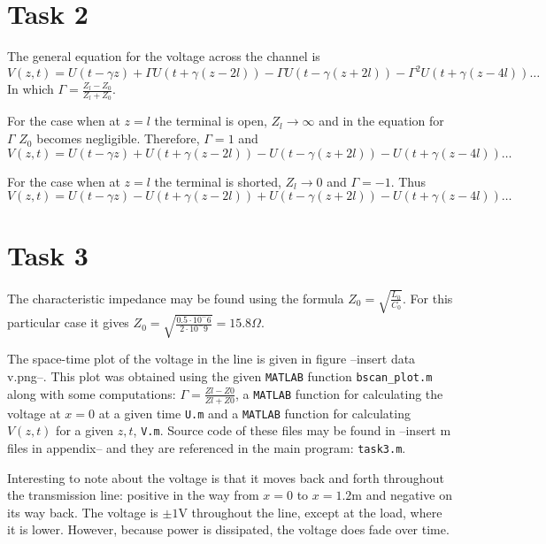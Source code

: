 \documentclass[11pt,titlepage]{report}
\begin{document}
\section{Task 2}
The general equation for the voltage across the channel is 
\begin{equation}
V(z,t)=U(t-\gamma z) + \Gamma U(t+\gamma(z-2l))-\Gamma U(t-\gamma(z+2l))-\Gamma^2U(t+\gamma(z-4l))\dots
\end{equation}
In which $\Gamma=\frac{Z_l-Z_0}{Z_l+Z_0}$.

For the case when at $z=l$ the terminal is open, $Z_l \to \infty$ and in the equation for $\Gamma$ $Z_0$ becomes negligible. Therefore, $\Gamma=1$ and 
\begin{equation}
V(z,t)=U(t-\gamma z) + U(t+\gamma(z-2l))- U(t-\gamma(z+2l))- U(t+\gamma(z-4l))\dots
\end{equation}

For the case when at $z=l$ the terminal is shorted, $Z_l \to 0$ and $\Gamma=-1$. Thus 
\begin{equation}
V(z,t)=U(t-\gamma z) - U(t+\gamma(z-2l))+U(t-\gamma(z+2l))-U(t+\gamma(z-4l))\dots
\end{equation}


\section{Task 3}
The characteristic impedance may be found using the formula $Z_0=\sqrt{\frac{L_0}{C_0}}$. For this particular case it gives $Z_0=\sqrt{\frac{0.5\cdot10^-6}{2\cdot10^-9}}=15.8\Omega$. 

The space-time plot of the voltage in the line is given in figure --insert data v.png--. This plot was obtained using the given \texttt{MATLAB} function \texttt{bscan\_plot.m} along with some computations: $\Gamma=\frac{Zl-Z0}{Zl+Z0}$, a \texttt{MATLAB} function for calculating the voltage at $x=0$ at a given time \texttt{U.m} and a \texttt{MATLAB} function for calculating $V(z,t)$ for a given $z,t$, \texttt{V.m}. Source code of these files may be found in --insert m files in appendix-- and they are referenced in the main program: \texttt{task3.m}.

Interesting to note about the voltage is that it moves back and forth throughout the transmission line: positive in the way from $x=0$ to $x=1.2$m and negative on its way back. The voltage is $\pm1 $V throughout the line, except at the load, where it is lower. However, because power is dissipated, the voltage does fade over time.
\end{document}
